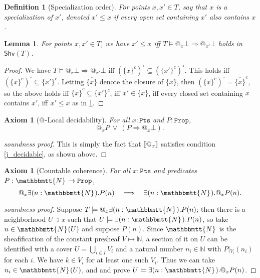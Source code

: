 \documentclass[reqno,11pt]{amsproc}
\makeatletter
\theoremstyle{plain}
\newtheorem{lemma}[theorem]{Lemma}
\newtheorem{definition}[theorem]{Definition}
\newtheorem{axiom}[theorem]{Axiom}\crefname{axiom}{Axiom}{Axioms}
\theoremstyle{definition}
\newenvironment{soundproof}{\begin{proof}[soundness proof]}{\end{proof}}
\DeclarePairedDelimiter{\church}{\llbracket}{\rrbracket}
\newcommand{\Const}[1]{\mathtt{#1}}
\newcommand{\cat}[1]{\mathsf{#1}}
\renewcommand{\to}[1][]{\xrightarrow{#1}}
\newcommand{\ol}[1]{\overline{#1}}
\newcommand{\internal}[1]{\raisebox{-.03ex}{$\mathbbmtt{#1}$}}
\newcommand{\nn}{\mathbb{N}}
\newcommand{\hs}{\hspace{1pt}}
\newcommand{\tnn}{\internal{N}\hs}
\newcommand{\shv}{\cat{Shv}}
\newcommand{\prop}{\Const{Prop}}
\newcommand{\pt}{x}
\newcommand{\pts}{\mathtt{Pts}}		%
\newcommand{\rest}[2]{#1\big|\hspace{0in}_{#2}}
\newcommand{\atsymbol}{{@}}
\newcommand{\at}[1][\pt]{\atsymbol_{#1}}
\newcommand{\imp}{\Rightarrow}
\numberwithin{equation}{section}
\makeatother
\begin{document}
\begin{definition}[Specialization order]\label{def.specialization}
For points $\pt,\pt' \in T$, say that $\pt$ is a \emph{specialization} of $\pt'$, denoted $\pt'\le\pt$ if every open set containing $\pt'$ also contains $\pt$.
\end{definition}

\begin{lemma}\label{prop.specialization}
For points $\pt,\pt'\in T$, we have $\pt'\le\pt$ iff $T\models\at\bot\imp\at[\pt']\bot$ holds in $\shv(T)$.
\end{lemma}

\begin{proof}
We have $T\models\at\bot\imp\at[\pt']\bot$ iff $(\{\pt\}^c)^\circ\subseteq(\{\pt'\}^c)^\circ$. This holds iff $(\{\pt\}^c)^\circ\subseteq\{\pt'\}^c$. Letting $\ol{\{\pt\}}$ denote the closure of $\{\pt\}$, then $(\{\pt\}^c)^\circ=\ol{\{\pt\}}^c$, so the above holds iff $\ol{\{\pt\}}^c\subseteq\{\pt'\}^c$, iff $\pt'\in\ol{\{\pt\}}$, iff every closed set containing $\pt$ contains $\pt'$, iff $\pt'\le\pt$ as in \cref{def.specialization}.
\end{proof}

\begin{axiom}[{$\at[]$-Local decidability}]\label{ax.local_dec}
	For all $\pt : \pts$ and $P : \prop$,
	\[
		\at P \: \lor \: (P \imp \at \bot).
	\]
\end{axiom}

\begin{soundproof}
	This is simply the fact that $\church{\at}$ satisfies condition \ref{j_decidable}, as shown above.
\end{soundproof}

\begin{axiom}[Countable coherence]
	\label{ax.N_flabby}
	For all $\pt : \pts$ and predicates $P : \tnn \to \prop$,
	\[
		\at \exists (n : \tnn) . P(n) \quad \Longrightarrow \quad \exists (n : \tnn) . \at P(n).
	\]
\end{axiom}

\begin{soundproof}
Suppose $T\models\at \exists (n : \tnn) . P(n)$; then there is a neighborhood $U\ni\pt$ such that $U\models\exists (n : \tnn) . P(n)$, so take $n\in\tnn(U)$ and suppose $P(n)$. Since $\tnn$ is the sheafification of the constant presheaf $V\mapsto\nn$, a section of it on $U$ can be identified with a cover $U=\bigcup_{i\in I}V_i$ and a natural number $n_i\in\nn$ with $\rest{P}{V_i}(n_i)$ for each $i$. We have $k\in V_i$ for at least one such $V_i$. Thus we can take $n_i\in\tnn(U)$, and and prove $U\models\exists(n:\tnn).\at P(n)$.
\end{soundproof}
\end{document}
